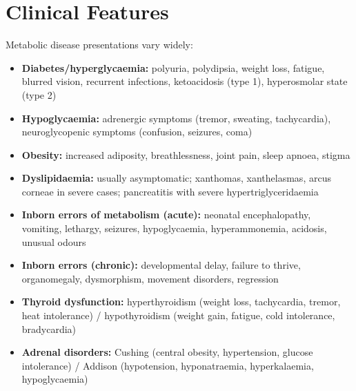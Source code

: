 \section*{Clinical Features}
Metabolic disease presentations vary widely:
\begin{itemize}
    \item \textbf{Diabetes/hyperglycaemia:} polyuria, polydipsia, weight loss, fatigue, blurred vision, recurrent infections, ketoacidosis (type 1), hyperosmolar state (type 2)
    \item \textbf{Hypoglycaemia:} adrenergic symptoms (tremor, sweating, tachycardia), neuroglycopenic symptoms (confusion, seizures, coma)
    \item \textbf{Obesity:} increased adiposity, breathlessness, joint pain, sleep apnoea, stigma
    \item \textbf{Dyslipidaemia:} usually asymptomatic; xanthomas, xanthelasmas, arcus corneae in severe cases; pancreatitis with severe hypertriglyceridaemia
    \item \textbf{Inborn errors of metabolism (acute):} neonatal encephalopathy, vomiting, lethargy, seizures, hypoglycaemia, hyperammonemia, acidosis, unusual odours
    \item \textbf{Inborn errors (chronic):} developmental delay, failure to thrive, organomegaly, dysmorphism, movement disorders, regression
    \item \textbf{Thyroid dysfunction:} hyperthyroidism (weight loss, tachycardia, tremor, heat intolerance) / hypothyroidism (weight gain, fatigue, cold intolerance, bradycardia)
    \item \textbf{Adrenal disorders:} Cushing (central obesity, hypertension, glucose intolerance) / Addison (hypotension, hyponatraemia, hyperkalaemia, hypoglycaemia)
\end{itemize}

